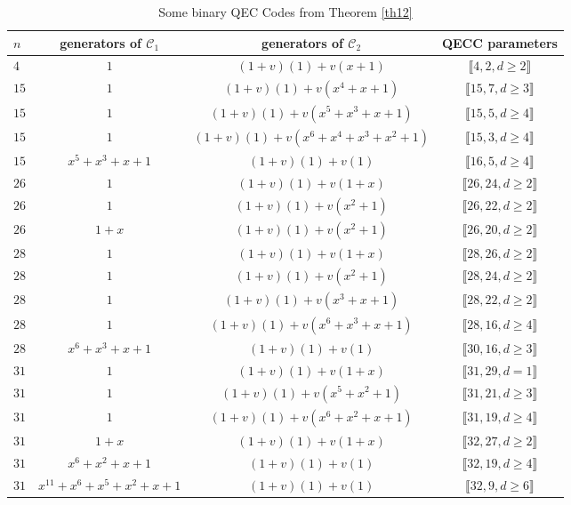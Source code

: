\documentclass[pdflatex,sn-mathphys-num]{sn-jnl}%
\theoremstyle{thmstyleone}%
\theoremstyle{thmstyletwo}%
\theoremstyle{thmstylethree}%
\begin{document}
\begin{table}[!ht]
\caption{Some binary QEC Codes from Theorem \ref{th12}}\label{TableTh10}
\begin{tabular}{lccc}
\toprule
$n$ & generators of $\mathcal{C}_{1}$ & generators of $\mathcal{C}_{2}$ & QECC
parameters \\
\midrule
$4$ & $1$ & $(1+v)(1) + v(x + 1)$ & $\llbracket 4,2,d\ge 2\rrbracket$   \\
$15$ & $1$ & $(1+v)(1)+v(x^{4}+x+1)$ & $\llbracket15,7,d\geq 3\rrbracket$ \\
$15$ & $1$ & $(1+v)(1)+v(x^{5}+x^{3}+x+1)$ & $\llbracket15,5,d\geq 4%
\rrbracket$ \\
$15$ & $1$ & $(1+v)(1)+v(x^{6}+x^{4}+x^{3}+x^{2}+1)$ & $\llbracket15,3,d\geq
4\rrbracket$ \\
$15$ & $x^{5}+x^{3}+x+1$ & $(1+v)(1)+v(1)$ & $\llbracket16,5,d\geq 4%
\rrbracket$ \\
$26$ & $1$ & $(1+v)(1)+v(1+x)$ & $\llbracket26,24,d\geq 2\rrbracket$ \\
$26$ & $1$ & $(1+v)(1)+v(x^{2}+1)$ & $\llbracket26,22,d\geq 2\rrbracket$ \\
$26$ & $1+x$ & $(1+v)(1)+v(x^{2}+1)$ & $\llbracket26,20,d\geq 2\rrbracket$
\\
$28$ & $1$ & $(1+v)(1)+v(1+x)$ & $\llbracket28,26,d\geq 2\rrbracket$
\\
$28$ & $1$ & $(1+v)(1)+v(x^{2}+1)$ & $\llbracket28,24,d\geq 2\rrbracket$ \\
$28$ & $1$ & $(1+v)(1)+v(x^{3}+x+1)$ & $\llbracket28,22,d\geq 2\rrbracket$
\\
$28$ & $1$ & $(1+v)(1)+v(x^{6}+x^{3}+x+1)$ & $\llbracket28,16,d\geq 4%
\rrbracket$ \\
$28$ & $x^{6}+x^{3}+x+1$ & $(1+v)(1)+v(1)$ & $\llbracket30,16,d\geq 3%
\rrbracket$ \\
$31$ & $1$ & $(1+v)(1)+v(1+x)$ & $\llbracket31,29,d= 1\rrbracket$ \\
$31$ & $1$ & $(1+v)(1)+v(x^{5}+x^{2}+1)$ & $\llbracket31,21,d\geq 3\rrbracket
$ \\
$31$ & $1$ & $(1+v)(1)+v(x^{6}+x^{2}+x+1)$ & $\llbracket31,19,d\geq 4%
\rrbracket$ \\
$31$ & $1+x$ & $(1+v)(1)+v(1+x)$ & $\llbracket32,27,d\geq 2\rrbracket$ \\
$31$ & $x^{6}+x^{2}+x+1$ & $(1+v)(1)+v(1)$ & $\llbracket32,19,d\geq 4%
\rrbracket$ \\
$31$ & $x^{11}+x^{6}+x^{5}+x^{2}+x+1$ & $(1+v)(1)+v(1)$ & $\llbracket%
32,9,d\geq 6\rrbracket$ \\

\end{tabular}
\end{table}
\end{document}
